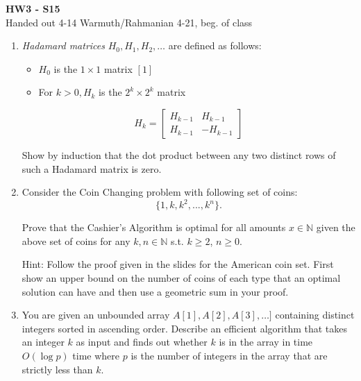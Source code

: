 \documentclass[11pt]{article}
\begin{document}
\begin{center}
{\bf\large HW3 - S15}\\
Handed out 4-14 \hfill Warmuth/Rahmanian \hfill 4-21, beg. of class \\
\end{center}

\begin{enumerate}
\item
\textit{Hadamard matrices} $H_0, H_1, H_2,
\ldots$ are defined as follows:
\begin{itemize} 
\item $H_0$ is the $1 \times 1$ matrix $[1]$
\item For $k>0, H_k$ is the $2^k \times 2^k$ matrix
\end{itemize}
\begin{displaymath}
H_k =
\begin{bmatrix}
H_{k-1} & H_{k-1} \\
H_{k-1} & -H_{k-1} 
\end{bmatrix}
\end{displaymath}

Show by induction that the dot product between any two distinct rows of
such a Hadamard matrix is zero.

\vspace*{.2cm}
\item Consider the Coin Changing problem with following set of coins:
\begin{displaymath}
\{ 1, k, k^2, ..., k^n \}.
\end{displaymath}

Prove that the Cashier's Algorithm is optimal for all 
amounts $x \in \mathbb{N}$ given the above set of coins 
for any $k,n\in \mathbb{N}$ s.t. $k\ge2$, $n\geq0$.

Hint: Follow the proof given in the slides for the American coin set.
First show an upper bound on the number of coins of
each type that an optimal solution can have and then use a
geometric sum in your proof.

\vspace*{.2cm}
\item 
You are given an unbounded array $A[1],A[2],A[3], \ldots]$ containing
distinct integers sorted in ascending order. Describe an
efficient algorithm that takes an integer $k$ as input and
finds out whether $k$ is in the array in time
$O(\log p)$ time where $p$ is the number of integers in the
array that are strictly less than $k$.


\end{enumerate}
\end{document}
